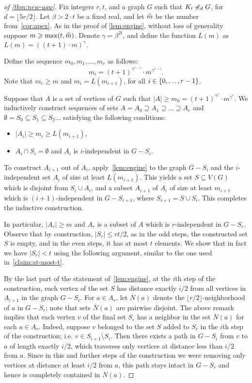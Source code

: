 \begin{proof}[of \cref{thm:new-uqw}]
Fix  integers $r,t$,  and a graph $G$ such that $K_t\not\preccurlyeq_{d} G$,
for $d=\lfloor 5r/2 \rfloor$. Let $\beta>2\cdot t$ be a fixed real, and let $\widehat{m}$ be the number from~\cref{cor:apex}. As in the proof of \cref{lem:engine}, without loss of generality suppose $m\geqslant \max(t,\widehat{m})$.
 Denote $\gamma=\beta^{2t}$, and
define the function $L(m)$ as $L(m)=((t+1)\cdot m)^\gamma$.

Define the sequence $m_0,m_1,\ldots,m_r$ as follows:
$$m_i=(t+1)^{\gamma^{r-i}}\cdot m^{\gamma^{r-i}}.$$ 
Note that $m_r\geq m$ and $m_i=L(m_{i+1})$, for all $i\in \{0,\ldots,r-1\}$.

Suppose that $A$ is a set of vertices of $G$ such that $|A|\ge m_0=(t+1)^{\gamma^{r}}\cdot m^{\gamma^{r}}$. 
We inductively construct sequences of sets $A= A_0\supseteq A_1\supseteq \ldots \supseteq A_r$ and $\emptyset=S_0\subseteq S_1\subseteq S_2\ldots$
satisfying the following conditions:
\begin{itemize}
	\item $|A_i|\ge m_i \ge L(m_{i+1})$,
	\item $A_i\cap S_i=\emptyset$ and $A_i$ is $i$-independent in $G-S_i$.
\end{itemize}
To construct $A_{i+1}$ out of $A_i$, apply~\cref{lem:engine} to the graph $G-S_i$ and 
the $i$-independent set $A_i$ of size at least $L(m_{i+1})$. This yields a set $S\subseteq V(G)$ which is disjoint from $S_i\cup A_i$, and a subset $A_{i+1}$ of $A_i$ of size 
at least $m_{i+1}$
which is $(i+1)$-independent in $G-S_{i+1}$, where $S_{i+1}=S\cup S_i$. This completes the inductive construction.

In particular,  $|A_r|\ge m$ and $A_r$ is a subset of $A$ which is $r$-independent in $G-S_r$.
Observe that by construction, $|S_r|\le r t/2$, as in the odd steps, the constructed set $S$ is empty, and in the even steps, it has at most $t$ elements. 
We show that in fact we have $|S_r|<t$ using the following argument, similar to the one used in~\cref{claim:at-most-t}.


By the last part of the statement of~\cref{lem:engine},  at the $i$th step of the construction, each vertex of the set $S$
has distance exactly $i/2$ from all vertices in $A_{i+1}$ in the graph 
$G-S_i$. 
For $a\in A_r$, let $\overline{N}(a)$ denote the $\lfloor r/2\rfloor$-neighborhood of $a$ in $G-S_r$; note that sets $\overline{N}(a)$ are pairwise disjoint.
The above remark implies that each vertex $v$ of the final set $S_r$ has a neighbor in the set $\overline{N}(a)$ for each $a\in A_r$.
Indeed, suppose $v$ belonged to the set $S$ added to $S_r$ in the $i$th step of the construction; i.e. $v\in S_{i+1}\setminus S_i$.
Then there exists a path in $G-S_i$ from $v$ to $a$ of length exactly $i/2$, which traverses only vertices at distance less than $i/2$ from $a$.
Since in this and further steps of the construction we were removing only vertices at distance at least $i/2$ from $a$, this path stays intact in $G-S_r$ and hence is completely contained in $\overline{N}(a)$.


\end{proof}
